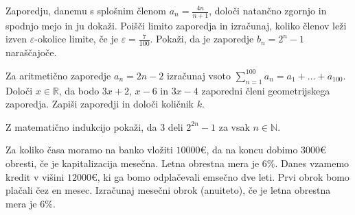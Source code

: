 \documentclass{izpit}
\begin{document}
\naloga[\tocke{8}]
  \podnaloga[4]
  Zaporedju, danemu s splošnim členom $a_n=\frac{4n}{n+1}$, določi natančno zgornjo in spodnjo mejo in ju dokaži.
  \prostor[1]
  \podnaloga[4]
  Poišči limito zaporedja in izračunaj, koliko členov leži izven $\varepsilon$-okolice limite, če je $\varepsilon=\frac{7}{100}$.
  \prostor[1]
  \naloga*[\tocke{3}]
  Pokaži, da je zaporedje $b_n=2^n-1$ naraščajoče.
  \prostor[1]

  
\naloga[\tocke{2}]
  Za aritmetično zaporedje $a_n=2n-2$ izračunaj vsoto $\sum_{n=1}^{100} a_n =a_1 +\ldots +a_{100}$.
  \prostor[1]
  \naloga*[\tocke{5}]
  Določi $x\in\mathbb{R}$, da bodo $3x+2$, $x-6$ in $3x-4$ zaporedni členi geometrijskega zaporedja. Zapiši zaporedji in določi količnik $k$.
  \prostor[3]


\naloga[\tocke{5}]
  Z matematično indukcijo pokaži, da $3$ deli $2^{2n}-1$ za vsak $n\in \mathbb{N}$.


\naloga[\tocke{8}]
  \podnaloga[4]
  Za koliko časa moramo na banko vložiti $10000\euro{}$, da na koncu dobimo $3000\euro{}$ obresti, če je kapitalizacija mesečna. Letna obrestna mera je $6\%$.
  \prostor[1]
  \podnaloga[4]
  Danes vzamemo kredit v višini $12000\euro{}$, ki ga bomo odplačevali emsečno dve leti. Prvi obrok bomo plačali čez en mesec. Izračunaj mesečni obrok (anuiteto), če je letna obrestna mera je $6\%$.
  \prostor[1]
\end{document}
